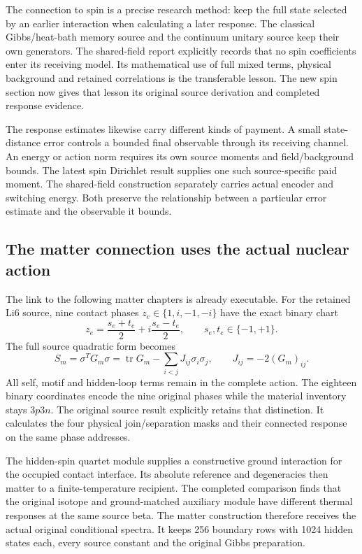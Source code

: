 The connection to spin is a precise research method: keep the full state selected by an earlier interaction when calculating a later response. The classical Gibbs/heat-bath memory source and the continuum unitary source keep their own generators. The shared-field report explicitly records that no spin coefficients enter its receiving model. Its mathematical use of full mixed terms, physical background and retained correlations is the transferable lesson. The new spin section now gives that lesson its original source derivation and completed response evidence.

The response estimates likewise carry different kinds of payment. A small state-distance error controls a bounded final observable through its receiving channel. An energy or action norm requires its own source moments and field/background bounds. The latest spin Dirichlet result supplies one such source-specific paid moment. The shared-field construction separately carries actual encoder and switching energy. Both preserve the relationship between a particular error estimate and the observable it bounds.

\subsection{The matter connection uses the actual nuclear action}

The link to the following matter chapters is already executable. For the retained Li6 source, nine contact phases $z_e\in\{1,i,-1,-i\}$ have the exact binary chart
\begin{equation}
 z_e=\frac{s_e+t_e}{2}+i\frac{s_e-t_e}{2},
 \qquad s_e,t_e\in\{-1,+1\}.
\end{equation}
The full source quadratic form becomes
\begin{equation}
 S_m=\sigma^TG_m\sigma
 =\operatorname{tr}G_m-\sum_{i<j}J_{ij}\sigma_i\sigma_j,
 \qquad J_{ij}=-2(G_m)_{ij}.
\end{equation}
All self, motif and hidden-loop terms remain in the complete action. The eighteen binary coordinates encode the nine original phases while the material inventory stays $3p3n$. The original source result explicitly retains that distinction. It calculates the four physical join/separation masks and their connected response on the same phase addresses.

The hidden-spin quartet module supplies a constructive ground interaction for the occupied contact interface. Its absolute reference and degeneracies then matter to a finite-temperature recipient. The completed comparison finds that the original isotope and ground-matched auxiliary module have different thermal responses at the same source beta. The matter construction therefore receives the actual original conditional spectra. It keeps 256 boundary rows with 1024 hidden states each, every source constant and the original Gibbs preparation.


